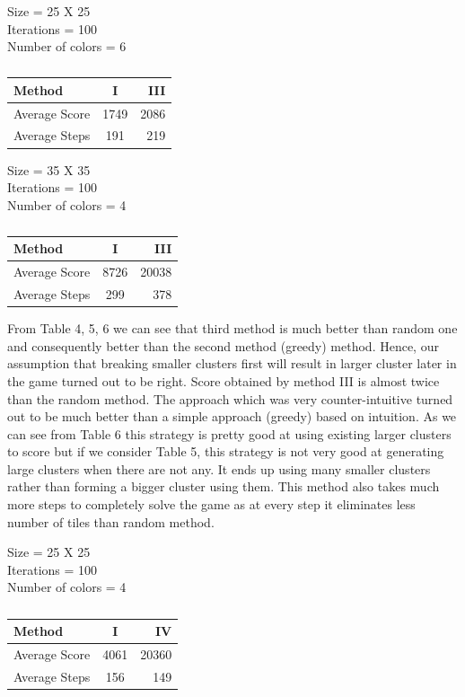 \documentclass[twoside]{article}
\begin{document}
\begin{multicols}{2}
\begin{table}[H]
\caption{}
Size = 25 X 25	\\
Iterations = 100\\
Number of colors = 6	\\
\centering
\begin{tabular}{l | c | r}
\toprule
Method & I & III \\
\hline
Average Score & 1749 & 2086 \\
\hline
Average Steps & 191 & 219 \\
\hline
\bottomrule
\end{tabular}

\end{table}
\begin{table}[H]
\caption{}
Size = 35 X 35	\\
Iterations = 100\\
Number of colors = 4	\\
\centering
\begin{tabular}{l | c | r}
\toprule
Method & I & III \\
\hline
Average Score & 8726 & 20038 \\
\hline
Average Steps & 299 & 378 \\
\hline
\bottomrule
\end{tabular}
\end{table}

From Table 4, 5, 6 we can see that third method is much better than random one and consequently better than the second method (greedy)
method. Hence, our assumption that breaking smaller clusters first will result in larger cluster later in the game turned out to be
right. Score obtained by method III is almost twice than the random method. The approach which was very counter-intuitive turned out 
to be much better than a simple approach (greedy) based on intuition. As we can see from Table 6 this strategy is pretty good at 
using existing larger clusters to score but if we consider Table 5, this strategy is not very good at generating large clusters when 
there are not any. It ends up using many smaller clusters rather than forming a bigger cluster using them. This method also takes 
much more steps to completely solve the game as at every step it eliminates less number of tiles than random method.


\begin{table}[H]
\caption{}
Size = 25 X 25	\\
Iterations = 100\\
Number of colors = 4	\\
\centering
\begin{tabular}{l | c| r}
\toprule
Method & I & IV \\
\hline
Average Score & 4061 & 20360 \\
\hline
Average Steps & 156 & 149 \\
\hline
\bottomrule
\end{tabular}
\end{table}


\end{multicols}
\end{document}
